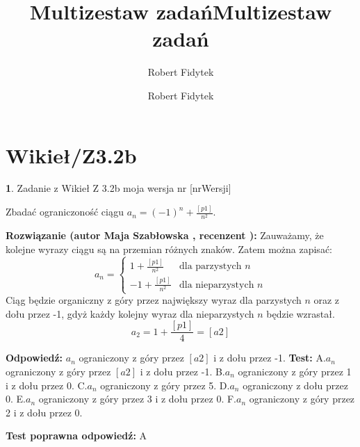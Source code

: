 \documentclass[12pt, a4paper]{article}
\title{Multizestaw zadań}
\author{Robert Fidytek}
\date{}\documentclass[12pt, a4paper]{article}
\title{Multizestaw zadań}
\author{Robert Fidytek}
\date{}
\theoremstyle{definition} %
\newtheorem{zad}{}
\theoremstyle{definition} %
\newtheorem{zad}{}
\newcommand{\kategoria}[1]{\section{#1}} %
\newcommand{\zadStart}[1]{\begin{zad}#1\newline} %
\newcommand{\zadStop}{\end{zad}}   %
\newcommand{\rozwStart}[2]{\noindent \textbf{Rozwiązanie (autor #1 , recenzent #2): }\newline} %
\newcommand{\rozwStop}{\newline}                                            %
\newcommand{\odpStart}{\noindent \textbf{Odpowiedź:}\newline}    %
\newcommand{\odpStop}{\newline}                                             %
\newcommand{\testStart}{\noindent \textbf{Test:}\newline} %
\newcommand{\testStop}{\newline} %
\newcommand{\kluczStart}{\noindent \textbf{Test poprawna odpowiedź:}\newline} %
\newcommand{\kluczStop}{\newline} %
\begin{document}
\maketitle


\kategoria{Wikieł/Z3.2b}
\zadStart{Zadanie z Wikieł Z 3.2b moja wersja nr [nrWersji]}


Zbadać ograniczoność ciągu $a_{n}=(-1)^{n}+\frac{[p1]}{n^{2}}$.

\zadStop

\rozwStart{Maja Szabłowska}{}
Zauważamy, że kolejne wyrazy ciągu są na przemian różnych znaków.
Zatem można zapisać:
$$
a_{n}=\left\{ \begin{array}{ll}
1+\frac{[p1]}{n^{2}} & \textrm{dla parzystych $n$}\\
-1+\frac{[p1]}{n^{2}} & \textrm{dla nieparzystych $n$}
\end{array} \right.
$$
Ciąg będzie organiczny z góry przez największy wyraz dla parzystych $n$ oraz z dołu przez -1, gdyż każdy kolejny wyraz dla nieparzystych $n$ będzie wzrastał.
$$a_{2}=1+\frac{[p1]}{4}=[a2]$$


\rozwStop


\odpStart
$a_{n}$ ograniczony z góry przez $[a2]$ i z dołu przez -1.
\odpStop
\testStart
A.$a_{n}$ ograniczony z góry przez $[a2]$ i z dołu przez -1.
B.$a_{n}$ ograniczony z góry przez 1 i z dołu przez 0.
C.$a_{n}$ ograniczony z góry przez 5.
D.$a_{n}$ ograniczony z dołu przez 0.
E.$a_{n}$ ograniczony z góry przez 3 i z dołu przez 0.
F.$a_{n}$ ograniczony z góry przez 2 i z dołu przez 0.


\testStop
\kluczStart
A
\kluczStop
\end{document}
